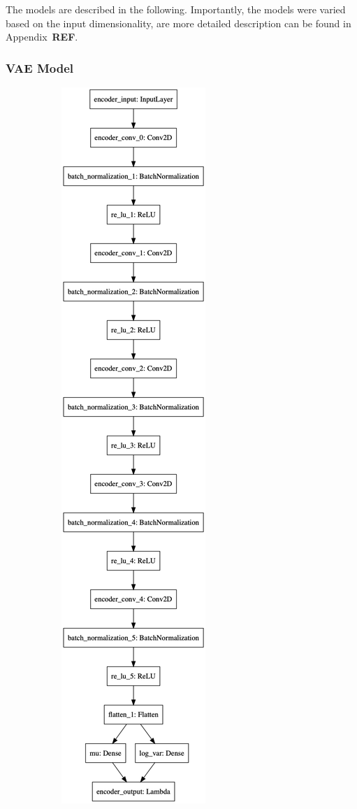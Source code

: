 The models are described in the following.
Importantly, the models were varied based on the input dimensionality, are more detailed description can be found in Appendix~\textbf{REF}.

\subsubsection{VAE Model}

\begin{figure}
    \centering
    \begin{subfigure}{.5\textwidth}
        \centering
        \includegraphics[width=\textwidth,height=.85\textheight,keepaspectratio]{images/vae/encoder.png}

\end{subfigure}
\end{figure}
